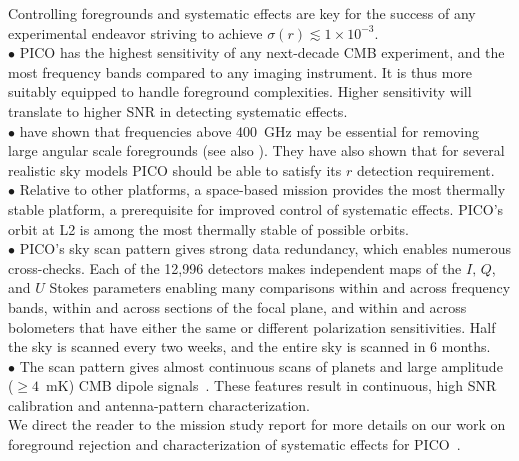 \documentclass[PICOAPC.tex]{subfiles}
\begin{document}
Controlling foregrounds and systematic effects are key for the success of any experimental endeavor striving to achieve $\sigma(r) \lesssim 1 \times 10^{-3}$. \\
$\bullet$ \hspace{0.1in}  PICO has the highest sensitivity of any next-decade CMB experiment, and the most frequency bands compared to any imaging instrument. It is thus more suitably equipped to handle foreground complexities. Higher sensitivity will translate to higher \ac{SNR} in detecting systematic effects. \\ 
$\bullet$ \hspace{0.1in}  \citet{pico_report} have shown that frequencies above 400~GHz may be essential for removing large angular scale foregrounds (see also \citet{hensley_2017}). They have also shown that for several realistic sky models PICO should be able to satisfy its $r$ detection requirement.  \\
$\bullet$ \hspace{0.1in}  Relative to other platforms, a space-based mission provides the most thermally stable platform,  a prerequisite for improved control of systematic effects. PICO's orbit at L2 is among the most thermally stable of possible orbits. \\
$\bullet$ \hspace{0.1in} PICO's sky scan pattern gives strong data redundancy, which enables numerous cross-checks. Each of the 12,996 detectors makes independent maps of the $I,\,Q$, and $U$ Stokes parameters enabling many comparisons within and across frequency bands, within and across sections of the focal plane, and within and across bolometers that have either the same or different polarization sensitivities. Half the sky is scanned every two weeks, and the entire sky is scanned in 6 months. \\
$\bullet$ \hspace{0.1in}  The scan pattern gives almost continuous scans of planets and large amplitude ($\geq 4$~mK) CMB dipole signals~\citep{picoweb_dipole}. These features result in continuous, high \ac{SNR} calibration and antenna-pattern characterization. \\
We direct the reader to the mission study report for more details on our work on foreground rejection and characterization of systematic effects for PICO~\citep{pico_report}.
\end{document}
